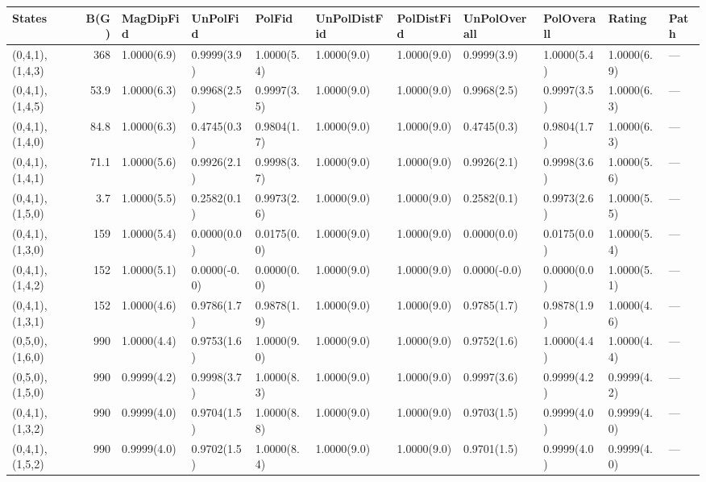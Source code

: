 \begin{tabular}{lrlllllllll}
\hline
 States          &   B(G) & MagDipFid   & UnPolFid     & PolFid      & UnPolDistFid   & PolDistFid   & UnPolOverall   & PolOverall   & Rating      & Path   \\
\hline
 (0,4,1),(1,4,3) &  368   & 1.0000(6.9) & 0.9999(3.9)  & 1.0000(5.4) & 1.0000(9.0)    & 1.0000(9.0)  & 0.9999(3.9)    & 1.0000(5.4)  & 1.0000(6.9) & ---    \\
 (0,4,1),(1,4,5) &   53.9 & 1.0000(6.3) & 0.9968(2.5)  & 0.9997(3.5) & 1.0000(9.0)    & 1.0000(9.0)  & 0.9968(2.5)    & 0.9997(3.5)  & 1.0000(6.3) & ---    \\
 (0,4,1),(1,4,0) &   84.8 & 1.0000(6.3) & 0.4745(0.3)  & 0.9804(1.7) & 1.0000(9.0)    & 1.0000(9.0)  & 0.4745(0.3)    & 0.9804(1.7)  & 1.0000(6.3) & ---    \\
 (0,4,1),(1,4,1) &   71.1 & 1.0000(5.6) & 0.9926(2.1)  & 0.9998(3.7) & 1.0000(9.0)    & 1.0000(9.0)  & 0.9926(2.1)    & 0.9998(3.6)  & 1.0000(5.6) & ---    \\
 (0,4,1),(1,5,0) &    3.7 & 1.0000(5.5) & 0.2582(0.1)  & 0.9973(2.6) & 1.0000(9.0)    & 1.0000(9.0)  & 0.2582(0.1)    & 0.9973(2.6)  & 1.0000(5.5) & ---    \\
 (0,4,1),(1,3,0) &  159   & 1.0000(5.4) & 0.0000(0.0)  & 0.0175(0.0) & 1.0000(9.0)    & 1.0000(9.0)  & 0.0000(0.0)    & 0.0175(0.0)  & 1.0000(5.4) & ---    \\
 (0,4,1),(1,4,2) &  152   & 1.0000(5.1) & 0.0000(-0.0) & 0.0000(0.0) & 1.0000(9.0)    & 1.0000(9.0)  & 0.0000(-0.0)   & 0.0000(0.0)  & 1.0000(5.1) & ---    \\
 (0,4,1),(1,3,1) &  152   & 1.0000(4.6) & 0.9786(1.7)  & 0.9878(1.9) & 1.0000(9.0)    & 1.0000(9.0)  & 0.9785(1.7)    & 0.9878(1.9)  & 1.0000(4.6) & ---    \\
 (0,5,0),(1,6,0) &  990   & 1.0000(4.4) & 0.9753(1.6)  & 1.0000(9.0) & 1.0000(9.0)    & 1.0000(9.0)  & 0.9752(1.6)    & 1.0000(4.4)  & 1.0000(4.4) & ---    \\
 (0,5,0),(1,5,0) &  990   & 0.9999(4.2) & 0.9998(3.7)  & 1.0000(8.3) & 1.0000(9.0)    & 1.0000(9.0)  & 0.9997(3.6)    & 0.9999(4.2)  & 0.9999(4.2) & ---    \\
 (0,4,1),(1,3,2) &  990   & 0.9999(4.0) & 0.9704(1.5)  & 1.0000(8.8) & 1.0000(9.0)    & 1.0000(9.0)  & 0.9703(1.5)    & 0.9999(4.0)  & 0.9999(4.0) & ---    \\
 (0,4,1),(1,5,2) &  990   & 0.9999(4.0) & 0.9702(1.5)  & 1.0000(8.4) & 1.0000(9.0)    & 1.0000(9.0)  & 0.9701(1.5)    & 0.9999(4.0)  & 0.9999(4.0) & ---    \\

\end{tabular}
